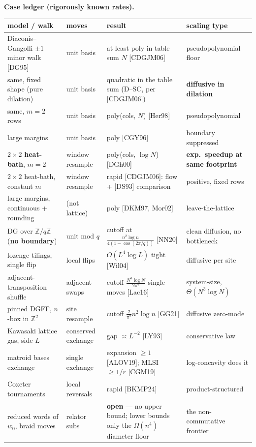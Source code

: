 \documentclass[11pt]{article}
\begin{document}
\textbf{Case ledger (rigorously known rates).}
\begin{center}\footnotesize\setlength{\tabcolsep}{4pt}
\begin{tabular}{p{4.6cm}p{2.6cm}p{5.4cm}p{3.0cm}}
\toprule
\textbf{model / walk} & \textbf{moves} & \textbf{result} & \textbf{scaling type} \\
\midrule
Diaconis--Gangolli $\pm1$ minor walk [DG95] & unit basis & at least poly in table sum $N$ [CDGJM06] & pseudopolynomial floor \\
same, fixed shape (pure dilation) & unit basis & quadratic in the table sum (D--SC, per [CDGJM06]) & \textbf{diffusive in dilation} \\
same, $m{=}2$ rows & unit basis & poly(cols, $N$) [Her98] & pseudopolynomial \\
large margins & unit basis & poly [CGY96] & boundary suppressed \\
$2\times2$ \textbf{heat-bath}, $m{=}2$ & window resample & poly(cols, $\log N$) [DGh00] & \textbf{exp.\ speedup at same footprint} \\
$2\times2$ heat-bath, constant $m$ & window resample & rapid [CDGJM06]: flow + [DS93] comparison & positive, fixed rows \\
large margins, continuous + rounding & (not lattice) & poly [DKM97, Mor02] & leave-the-lattice \\
DG over $\mathbb{Z}/q\mathbb{Z}$ (\textbf{no boundary}) & unit mod $q$ & cutoff at $\frac{n^2\log n}{4(1-\cos(2\pi/q))}$ [NN20] & clean diffusion, no bottleneck \\
lozenge tilings, single flip & local flips & $O(L^4\log L)$ tight [Wil04] & diffusive per site \\
adjacent-transposition shuffle & adjacent swaps & cutoff $\frac{N^3\log N}{2\pi^2}$ single moves [Lac16] & system-size, $\Theta(N^3\log N)$ \\
pinned DGFF, $n$-box in $\mathbb{Z}^2$ & site resample & cutoff $\frac{2}{\pi^2}n^2\log n$ [GG21] & diffusive zero-mode \\
Kawasaki lattice gas, side $L$ & conserved exchange & gap $\asymp L^{-2}$ [LY93] & conservative law \\
matroid bases exchange & single exchange & expansion $\ge1$ [ALOV19]; MLSI $\ge1/r$ [CGM19] & log-concavity does it \\
Coxeter tournaments & local reversals & rapid [BKMP24] & product-structured \\
reduced words of $w_0$, braid moves & relator subs & \textbf{open} --- no upper bound; lower bounds only the $\Omega(n^4)$ diameter floor & the non-commutative frontier \\
\bottomrule
\end{tabular}
\end{center}
\end{document}
